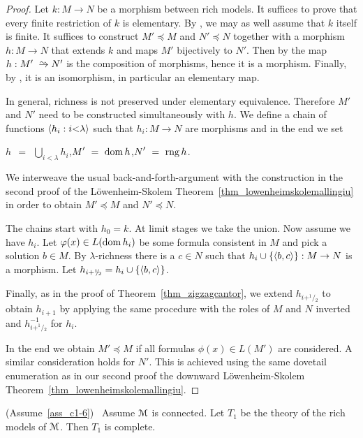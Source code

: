 \begin{proof}
Let $k:M\to N$ be a morphism between rich models.
It suffices to prove that every finite restriction of $k$ is elementary.
By , we may as well assume that $k$ itself is finite.
It suffices to construct $M'\preceq M$ and  $N'\preceq N$ together with a morphism $h:M\to N$ that extends $k$ and maps $M'$ bijectively to $N'$.
Then by  the map $h:M'\isomap N'$ is the composition of morphisms, hence it is a morphism.
Finally, by , it is an isomorphism, in particular an elementary map.

In general, richness is not preserved under elementary equivalence.
Therefore $M'$ and $N'$ need to be constructed simultaneously with $h$.
We define a chain of functions $\langle h_i:i{<}\lambda\rangle$ such that $h_i:M\to N$ are mor\-phisms and in the end we set

\hfil  $\displaystyle h\ \ =\ \ \bigcup_{i<\lambda}h_i$,\hfil $\displaystyle M'\ =\ \mathop{\rm dom} h$,\hfil $\displaystyle N'\ =\ \mathop{\rm rng} h$.

We interweave the usual back-and-forth-argument with the construction in the second proof of the Löwenheim-Skolem Theorem~\ref{thm_lowenheimskolemallingiu} in order to obtain $M'\preceq M$ and  $N'\preceq N$.

The chains start with $h_0=k$.
At limit stages we take the union.
Now assume we have $h_i$.
Let $\varphi(x)\in L(\mathop{\rm dom} h_i)$ be some formula consistent in $M$ and pick a solution $b\in M$.
By $\lambda$-richness there is a $c\in N$ such that $h_i\cup\{\langle b,c\rangle\}:M\to N$ is a morphism.
Let $h_{i+^1\!\!/\!_2}=h_i\cup\{\langle b,c\rangle\}$.

Finally, as in the proof of Theorem~\ref{thm_zigzagcantor}, we extend $h_{i+^1\!\!/\!_2}$ to obtain $h_{i+1}$ by applying the same procedure with the roles of $M$ and $N$ inverted and $h^{-1}_{i+^1\!\!/\!_2}$ for $h_i$.

In the end we obtain $M'\preceq M$ if all formulas $\phi(x)\in L(M')$ are considered.
A similar consideration holds for $N'$.
This is achieved using the same dovetail enumeration as in our second proof the downward Löwenheim-Skolem Theorem~\ref{thm_lowenheimskolemallingiu}.
\end{proof}

\begin{corollary}
  (Assume~\ref{ass_c1-6})  \  Assume $\EuScript M$ is connected.
  Let $T_1$ be the theory of the rich models of $\EuScript M$.
  Then $T_1$ is complete.
\end{corollary}


